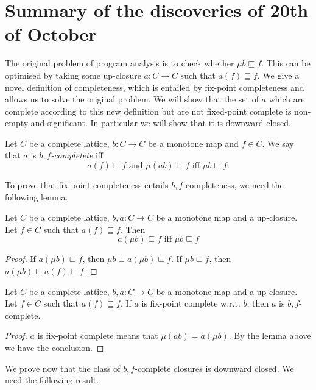 \documentclass{llncs}
\begin{document}
\section{Summary of the discoveries of 20th of October}
The original problem of program analysis is to check whether $\mu b \sqsubseteq f$. This can be optimised by taking some up-closure $a\colon C \to C$ such that $a(f)\sqsubseteq f$. We give a novel definition of completeness, which is entailed by fix-point completeness and allows us to solve the original problem. We will show that the set of $a$ which are complete according to this new definition but are not fixed-point complete is non-empty and significant. In particular we will show that it is downward closed.

\medskip

Let $C$ be a complete lattice, $b\colon C \to C$ be a monotone map and $f\in C$. We say that $a$ is \emph{$b,f$-completete} iff
\begin{equation}
a(f)\sqsubseteq f \text{ and }  \mu (a b) \sqsubseteq f \text{ iff } \mu b \sqsubseteq f\text{.}
\end{equation}

To prove that fix-point completeness entails $b,f$-completeness, we need the following lemma.

\begin{lemma} Let $C$ be a complete lattice, $b,a\colon C \to C$ be a monotone map and a up-closure. Let $f\in C$ such that $a(f)\sqsubseteq f$. Then 
$$ a(\mu b) \sqsubseteq f \text{ iff } \mu b \sqsubseteq f$$
\end{lemma}
\begin{proof}
If $a(\mu b) \sqsubseteq f$, then $\mu b \sqsubseteq a(\mu b) \sqsubseteq f$.
%
If $\mu b \sqsubseteq f$, then $a(\mu b) \sqsubseteq a(f) \sqsubseteq f$.
\end{proof}


\begin{proposition}
Let $C$ be a complete lattice, $b,a\colon C \to C$ be a monotone map and a up-closure. Let $f\in C$ such that $a(f)\sqsubseteq f$. If $a$ is fix-point complete w.r.t. $b$, then $a$ is $b,f$-complete.
\end{proposition}
\begin{proof}
$a$ is fix-point complete means that $\mu (ab)=a(\mu b)$. By the lemma above we have the conclusion.
\end{proof}

We prove now that the class of $b,f$-complete closures is downward closed. We need the following result.
\end{document}
